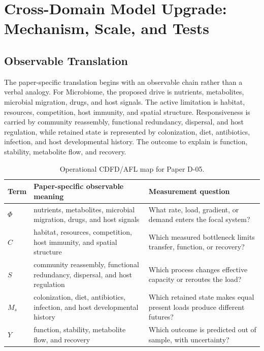 \documentclass[11pt,a4paper]{article}
\begin{document}
\section{Cross-Domain Model Upgrade: Mechanism, Scale, and Tests}

\subsection{Observable Translation}

The paper-specific translation begins with an observable chain rather than a
verbal analogy. For Microbiome, the proposed drive is nutrients, metabolites, microbial migration, drugs, and host signals.
The active limitation is habitat, resources, competition, host immunity, and spatial structure. Responsiveness is carried by
community reassembly, functional redundancy, dispersal, and host regulation, while retained state is represented by
colonization, diet, antibiotics, infection, and host developmental history. The outcome to explain is function, stability, metabolite flow, and recovery.

\begin{table}[htbp]
\centering
\small
\caption{Operational CDFD/AFL map for Paper D-05.}
\begin{tabularx}{\textwidth}{|l|X|X|}
\hline
\textbf{Term} & \textbf{Paper-specific observable meaning} & \textbf{Measurement question} \\
\hline
$\Phi$ & nutrients, metabolites, microbial migration, drugs, and host signals & What rate, load, gradient, or demand enters the focal system? \\
\hline
$C$ & habitat, resources, competition, host immunity, and spatial structure & Which measured bottleneck limits transfer, function, or recovery? \\
\hline
$S$ & community reassembly, functional redundancy, dispersal, and host regulation & Which process changes effective capacity or reroutes the load? \\
\hline
$M_s$ & colonization, diet, antibiotics, infection, and host developmental history & Which retained state makes equal present loads produce different futures? \\
\hline
$Y$ & function, stability, metabolite flow, and recovery & Which outcome is predicted out of sample, with uncertainty? \\
\hline
\end{tabularx}
\end{table}
\end{document}
